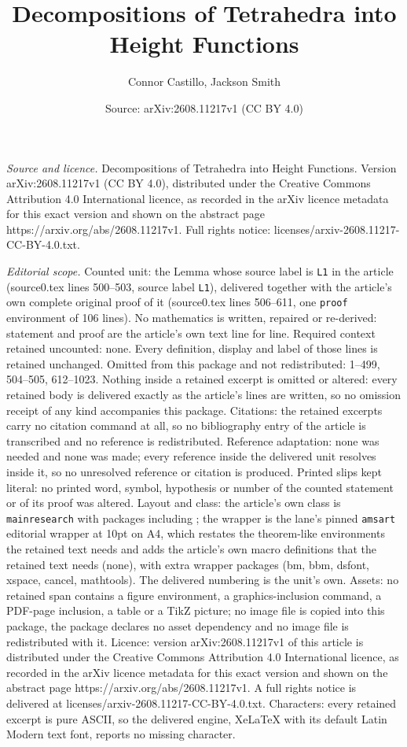 \documentclass[10pt,a4paper]{amsart}
\title[Decompositions of Tetrahedra into Height Functions]{Decompositions of Tetrahedra into Height Functions}
\author{Connor Castillo, Jackson Smith}
\date{Source: arXiv:2608.11217v1 (CC BY 4.0)}
\begin{document}
\maketitle

\noindent\emph{Source and licence.} Decompositions of Tetrahedra into Height Functions. Version arXiv:2608.11217v1 (CC BY 4.0), distributed under the Creative Commons Attribution 4.0 International licence, as recorded in the arXiv licence metadata for this exact version and shown on the abstract page https://arxiv.org/abs/2608.11217v1. Full rights notice: licenses/arxiv-2608.11217-CC-BY-4.0.txt.\par\smallskip

\noindent\textit{Editorial scope.} Counted unit: the Lemma whose source label is \texttt{L1} in the article (source0.tex lines 500--503, source label \texttt{L1}), delivered together with the article's own complete original proof of it (source0.tex lines 506--611, one \texttt{proof} environment of 106 lines). No mathematics is written, repaired or re-derived: statement and proof are the article's own text line for line. Required context retained uncounted: none. Every definition, display and label of those lines is retained unchanged. Omitted from this package and not redistributed: 1--499, 504--505, 612--1023. Nothing inside a retained excerpt is omitted or altered: every retained body is delivered exactly as the article's lines are written, so no omission receipt of any kind accompanies this package. Citations: the retained excerpts carry no citation command at all, so no bibliography entry of the article is transcribed and no reference is redistributed. Reference adaptation: none was needed and none was made; every reference inside the delivered unit resolves inside it, so no unresolved reference or citation is produced. Printed slips kept literal: no printed word, symbol, hypothesis or number of the counted statement or of its proof was altered. Layout and class: the article's own class is \texttt{mainresearch} with packages including ; the wrapper is the lane's pinned \texttt{amsart} editorial wrapper at 10pt on A4, which restates the theorem-like environments the retained text needs and adds the article's own macro definitions that the retained text needs (none), with extra wrapper packages (bm, bbm, dsfont, xspace, cancel, mathtools). The delivered numbering is the unit's own. Assets: no retained span contains a figure environment, a graphics-inclusion command, a PDF-page inclusion, a table or a TikZ picture; no image file is copied into this package, the package declares no asset dependency and no image file is redistributed with it. Licence: version arXiv:2608.11217v1 of this article is distributed under the Creative Commons Attribution 4.0 International licence, as recorded in the arXiv licence metadata for this exact version and shown on the abstract page https://arxiv.org/abs/2608.11217v1. A full rights notice is delivered at licenses/arxiv-2608.11217-CC-BY-4.0.txt. Characters: every retained excerpt is pure ASCII, so the delivered engine, XeLaTeX with its default Latin Modern text font, reports no missing character.
\end{document}
